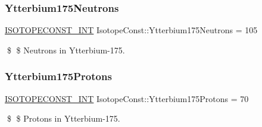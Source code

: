 \subsubsection{\texorpdfstring{Ytterbium175\+Neutrons}{Ytterbium175Neutrons}}
{\footnotesize\ttfamily \mbox{\hyperlink{group___isotope_const-_macros_ga5f18360b3e99483a35c32d789e62621c}{I\+S\+O\+T\+O\+P\+E\+C\+O\+N\+S\+T\+\_\+\+I\+NT}} Isotope\+Const\+::\+Ytterbium175\+Neutrons = 105}

\$ \$ Neutrons in Ytterbium-\/175. \mbox{\label{group___isotope_const-_ytterbium-_yb175_gad826bae12093be965e2bd3c144ea4efc}} 
\subsubsection{\texorpdfstring{Ytterbium175\+Protons}{Ytterbium175Protons}}
{\footnotesize\ttfamily \mbox{\hyperlink{group___isotope_const-_macros_ga5f18360b3e99483a35c32d789e62621c}{I\+S\+O\+T\+O\+P\+E\+C\+O\+N\+S\+T\+\_\+\+I\+NT}} Isotope\+Const\+::\+Ytterbium175\+Protons = 70}

\$ \$ Protons in Ytterbium-\/175. 